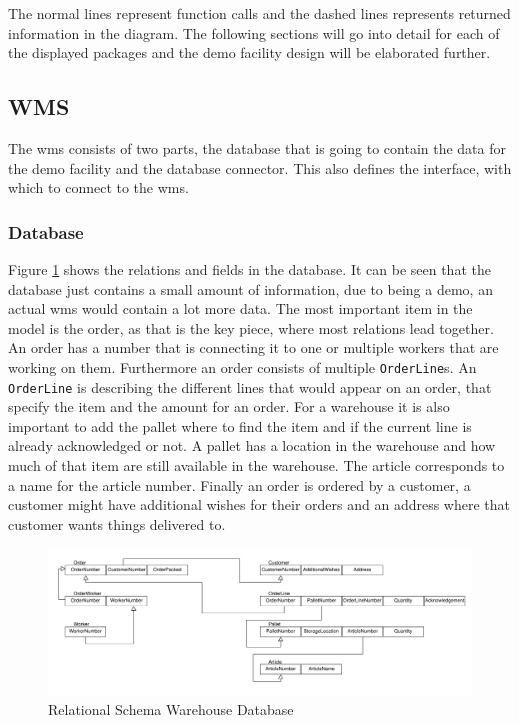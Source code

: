 The normal lines represent function calls and the dashed lines represents returned information in the diagram. The following sections will go into detail for each of the displayed packages and the demo facility design will be elaborated further.


\subsection{WMS}
The \acrlong{wms} consists of two parts, the database that is going to contain the data for the demo facility and the database connector. This also defines the interface, with which to connect to the \gls{wms}.

\subsubsection{Database}

Figure \ref{fig:LogicalModelWMS} shows the relations and fields in the database. It can be seen that the database just contains a small amount of information, due to being a demo, an actual \gls{wms} would contain a lot more data. The most important item in the model is the order, as that is the key piece, where most relations lead together. An order has a number that is connecting it to one or multiple workers that are working on them. Furthermore an order consists of multiple \texttt{OrderLine}s. An \texttt{OrderLine} is describing the different lines that would appear on an order, that specify the item and the amount for an order. For a warehouse it is also important to add the pallet where to find the item and if the current line is already acknowledged or not. A pallet has a location in the warehouse and how much of that item are still available in the warehouse. The article corresponds to a name for the article number. Finally an order is ordered by a customer, a customer might have additional wishes for their orders and an address where that customer wants things delivered to.

\begin{figure}[H]
	\includegraphics[width=\textwidth]{images/LogicalModel_MockWMS}
	\caption{Relational Schema Warehouse Database}
	\label{fig:LogicalModelWMS}
\end{figure}

